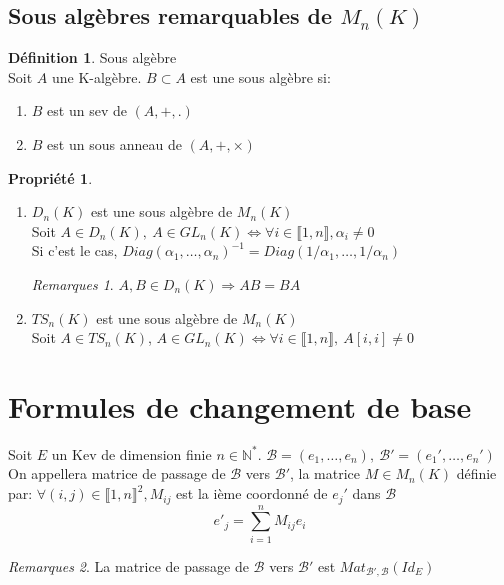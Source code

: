 \documentclass[fleqn]{article}
\theoremstyle{definition} \newtheorem*{defi}{D\'efinition}
\theoremstyle{definition} \newtheorem*{theo}{Th\'eor\`eme}
\theoremstyle{definition} \newtheorem*{coro}{Corollaire}
\theoremstyle{definition} \newtheorem*{nota}{Notation}
\theoremstyle{definition} \newtheorem*{vocab}{Vocabulaire}
\theoremstyle{remark} \newtheorem*{rqs}{Remarques}
\theoremstyle{definition} \newtheorem*{prop}{Propri\'et\'e}
\begin{document}
\subsection{Sous alg\`ebres remarquables de $M_n(K)$}
\begin{defi} Sous alg\`ebre \\
	Soit $A$ une K-alg\`ebre. $B \subset A$ est une sous alg\`ebre si:
	\begin{enumerate}
		\item $B$ est un sev de $(A, +, .)$
		\item $B$ est un sous anneau de $(A,+,\times)$
	\end{enumerate}
\end{defi}

\begin{prop} $ $
	\begin{enumerate}
		\item $D_n(K)$ est une sous alg\`ebre de $M_n(K)$\\
			Soit $A \in D_n(K),\ A \in GL_n(K) \Leftrightarrow \forall i \in  \llbracket 1,n \rrbracket , \alpha_i \neq 0$\\
			Si c'est le cas, $Diag(\alpha_1, \hdots, \alpha_n)^{-1} = Diag(1/\alpha_1, \hdots, 1/\alpha_n)$
			\begin{rqs} $A,B \in D_n(K) \Rightarrow AB = BA$ \end{rqs}
		\item $TS_n(K)$ est une sous alg\`ebre de $M_n(K)$ \\
			Soit $A \in TS_n(K)$, $A \in GL_n(K) \Leftrightarrow \forall i \in  \llbracket 1,n \rrbracket ,\ A[i,i] \neq 0$
	\end{enumerate}
\end{prop}

\section{Formules de changement de base}
Soit $E$ un Kev de dimension finie $n \in \mathbb{N}^*$. $\mathscr{B} = (e_1, \hdots, e_n),\ \mathscr{B}' = (e_1', \hdots, e_n')$ \\
On appellera matrice de passage de $\mathscr{B}$ vers $\mathscr{B}'$, la matrice $M \in M_n(K)$ d\'efinie par: $\forall (i,j) \in  \llbracket 1,n \rrbracket ^2,
M_{ij}$ est la i\`eme coordonn\'e de $e_j'$ dans $\mathscr{B}$
\[e'_j = \sum_{i=1}^n M_{ij}e_i\]

\begin{rqs}
	La matrice de passage de $\mathscr{B}$ vers $\mathscr{B}'$ est $Mat_{\mathscr{B}',\mathscr{B}}(Id_E)$
\end{rqs}
\end{document}
